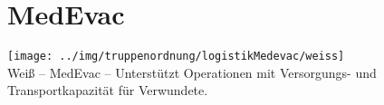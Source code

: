 \section{MedEvac}
\texttt{[image: ../img/truppenordnung/logistikMedevac/weiss]}\\
Weiß -- \acf{MedEvac} -- Unterstützt Operationen mit Versorgungs- und Transportkapazität für Verwundete.